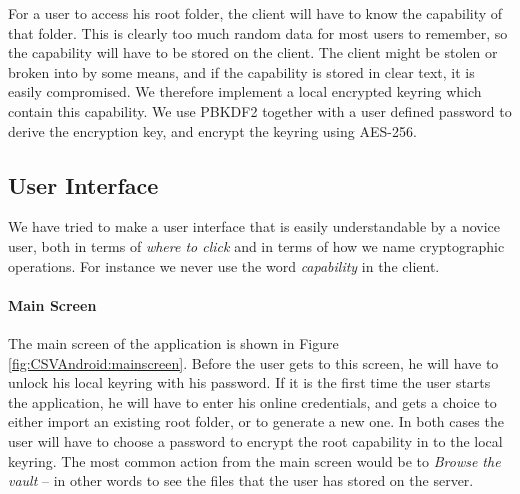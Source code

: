 \documentclass[pdftex,english,10pt,b5paper,twoside]{book}
\begin{document}
For a user to access his root folder, the client will have to know the
capability of that folder. This is clearly too much random data for most users
to remember, so the capability will have to be stored on the client.  The
client might be stolen or broken into by some means, and if the capability is
stored in clear text, it is easily compromised. We therefore implement a local
encrypted keyring which contain this capability. We use \ac{PBKDF2} together
with a user defined password to derive the encryption key, and encrypt the
keyring using \ac{AES}-256.


\subsection{User Interface}

We have tried to make a user interface that is easily understandable by a
novice user, both in terms of \emph{where to click} and in terms of how we name
cryptographic operations. For instance we never use the word \emph{capability}
in the client.

\paragraph{Main Screen}

The main screen of the application is shown in Figure
\ref{fig:CSVAndroid:mainscreen}. Before the user gets to this screen, he will
have to unlock his local keyring with his password. If it is the first time the
user starts the application, he will have to enter his online credentials, and
gets a choice to either import an existing root folder, or to generate a new
one. In both cases the user will have to choose a password to encrypt the root
capability in to the local keyring. The most common action from the main screen
would be to \emph{Browse the vault} -- in other words to see the files that the
user has stored on the server.
\end{document}
